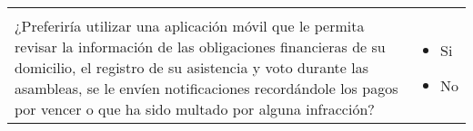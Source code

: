 \begin{center}
\begin{small}
\begin{longtable}[c]{p{} p{}}
\begin{itemize}
			\end{itemize} \\
			¿Preferiría utilizar una aplicación móvil que le permita revisar la información de las obligaciones financieras de su domicilio, el registro de su asistencia y voto durante las asambleas, se le envíen notificaciones recordándole los pagos por vencer o que ha sido multado por alguna infracción? &
			\begin{itemize}
				\item Si
				\item No
			\end{itemize} \\
			\hline
		\end{longtable}
	\end{small}
\end{center}
